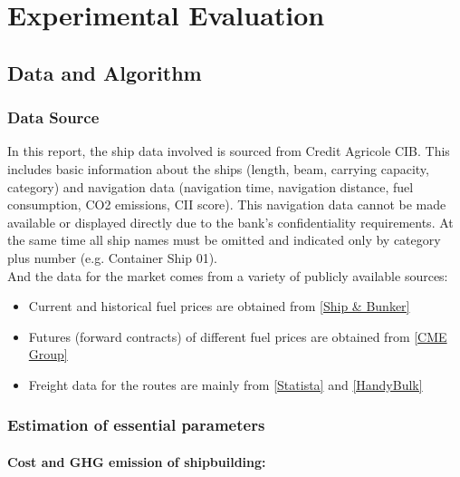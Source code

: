 \documentclass[a4paper,12pt]{article}
\begin{document}
\section{Experimental Evaluation}

\subsection{Data and Algorithm}

\subsubsection{Data Source}
In this report, the ship data involved is sourced from Credit Agricole CIB. This includes basic information about the ships (length, beam, carrying capacity, category) and navigation data (navigation time, navigation distance, fuel consumption, CO2 emissions, CII score).
This navigation data cannot be made available or displayed directly due to the bank's confidentiality requirements.
At the same time all ship names must be omitted and indicated only by category plus number (e.g. Container Ship 01).\\


And the data for the market comes from a variety of publicly available sources:
\begin{itemize}
	\item Current and historical fuel prices are obtained from \href{https://shipandbunker.com/prices}{[Ship \& Bunker]}
	\item Futures (forward contracts) of different fuel prices are obtained from \href{https://www.cmegroup.com/markets/energy/refined-products/mini-european-fob-rdam-marine-fuel-05-barges-platts.html}{[CME Group]}
	\item Freight data for the routes are mainly from \href{https://www.statista.com/statistics/1313360/container-freight-index-shanghai-rotterdam}{[Statista]} and \href{https://www.handybulk.com/ship-charter-rates/}{[HandyBulk]}
\end{itemize}

\subsubsection{Estimation of essential parameters}

\paragraph{Cost and GHG emission of shipbuilding:}
\end{document}
